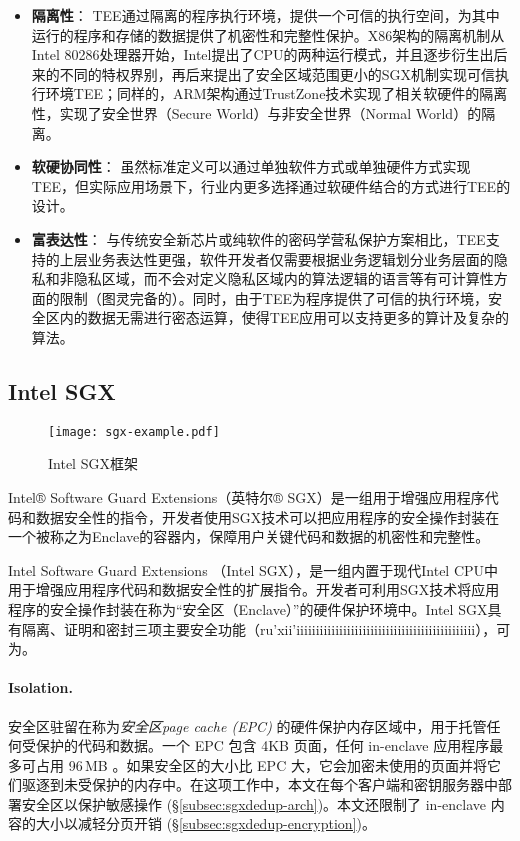 \begin{itemize}
    \item \textbf{隔离性}：
    TEE通过隔离的程序执行环境，提供一个可信的执行空间，为其中运行的程序和存储的数据提供了机密性和完整性保护。X86架构的隔离机制从Intel 80286处理器开始，Intel提出了CPU的两种运行模式，并且逐步衍生出后来的不同的特权界别，再后来提出了安全区域范围更小的SGX机制实现可信执行环境TEE；同样的，ARM架构通过TrustZone技术实现了相关软硬件的隔离性，实现了安全世界（Secure World）与非安全世界（Normal World）的隔离。
    \item \textbf{软硬协同性}：
    虽然标准定义可以通过单独软件方式或单独硬件方式实现TEE，但实际应用场景下，行业内更多选择通过软硬件结合的方式进行TEE的设计。
    \item \textbf{富表达性}：
    与传统安全新芯片或纯软件的密码学营私保护方案相比，TEE支持的上层业务表达性更强，软件开发者仅需要根据业务逻辑划分业务层面的隐私和非隐私区域，而不会对定义隐私区域内的算法逻辑的语言等有可计算性方面的限制（图灵完备的）。同时，由于TEE为程序提供了可信的执行环境，安全区内的数据无需进行密态运算，使得TEE应用可以支持更多的算计及复杂的算法。
\end{itemize}

\subsection{Intel SGX}
\label{subsec:background-tee-sgx}

\begin{figure}[!htb]
    \small
    \centering
    \texttt{[image: sgx-example.pdf]}
    \caption{Intel SGX框架} 
    \label{fig:sgx-arch}
\end{figure}



Intel® Software Guard Extensions（英特尔® SGX）是一组用于增强应用程序代码和数据安全性的指令，开发者使用SGX技术可以把应用程序的安全操作封装在一个被称之为Enclave的容器内，保障用户关键代码和数据的机密性和完整性。

Intel Software Guard Extensions （Intel SGX）\cite{sgx,sgx2}，是一组内置于现代Intel CPU中用于增强应用程序代码和数据安全性的扩展指令。开发者可利用SGX技术将应用程序的安全操作封装在称为“安全区（Enclave）”的硬件保护环境中。Intel SGX具有隔离、证明和密封三项主要安全功能（ru'xii'iiiiiiiiiiiiiiiiiiiiiiiiiiiiiiiiiiiiiiiiiiiiii），可为。

\paragraph*{Isolation.}安全区驻留在称为\textit{安全区page cache (EPC)} 的硬件保护内存区域中，用于托管任何受保护的代码和数据。一个 EPC 包含 4KB 页面，任何 in-enclave 应用程序最多可占用 96\,MB \cite{harnik18}。如果安全区的大小比 EPC 大，它会加密未使用的页面并将它们驱逐到未受保护的内存中。在这项工作中，本文在每个客户端和密钥服务器中部署安全区以保护敏感操作 (\S\ref{subsec:sgxdedup-arch})。本文还限制了 in-enclave 内容的大小以减轻分页开销 (\S\ref{subsec:sgxdedup-encryption})。

